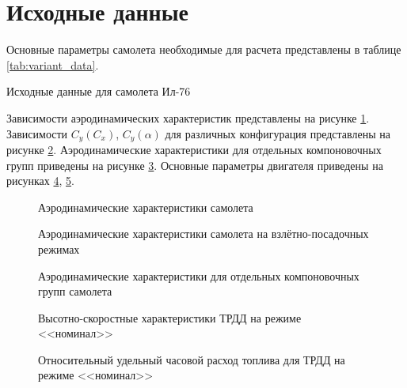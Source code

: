 \section{Исходные данные}\label{sec:variant_data}

Основные параметры самолета необходимые для расчета представлены в таблице
\ref{tab:variant_data}.

\begin{table}[H]
    \centering
    \caption{Исходные данные для самолета Ил-76}
    \label{tab:variant_data}
    \resizebox{\textwidth}{!}{
        
    }
\end{table}

Зависимости аэродинамических характеристик представлены на рисунке
\ref{fig:aero_data}. Зависимости $C_y(C_x)$, $C_y(\alpha)$ для различных 
конфигурация представлены на рисунке \ref{fig:aero_data_landing}.
Аэродинамические характеристики для отдельных компоновочных групп приведены на
рисунке \ref{fig:aero_data_elements}.
Основные параметры двигателя приведены на рисунках \ref{fig:tilda_P_data},
\ref{fig:tilda_Ce_data}.

\begin{figure}[H]
    \centering
    \resizebox{0.75\textwidth}{!}{}
    \caption{Аэродинамические характеристики самолета}
    \label{fig:aero_data}
\end{figure}
\begin{figure}[H]
    \centering
    \resizebox{0.75\textwidth}{!}{}
    \caption{Аэродинамические характеристики самолета на взлётно-посадочных режимах}
    \label{fig:aero_data_landing}
\end{figure}
\begin{figure}[H]
    \centering
    \resizebox{0.75\textwidth}{!}{}
    \caption{Аэродинамические характеристики для отдельных компоновочных групп самолета}
    \label{fig:aero_data_elements}
\end{figure}
\begin{figure}[H]
    \centering
    \resizebox{0.75\textwidth}{!}{}
    \caption{Высотно-скоростные характеристики ТРДД на режиме <<номинал>>}
    \label{fig:tilda_P_data}
\end{figure}
\begin{figure}[H]
    \centering
    \resizebox{0.75\textwidth}{!}{}
    \caption{Относительный удельный часовой расход топлива для ТРДД на режиме <<номинал>>}
    \label{fig:tilda_Ce_data}
\end{figure}
